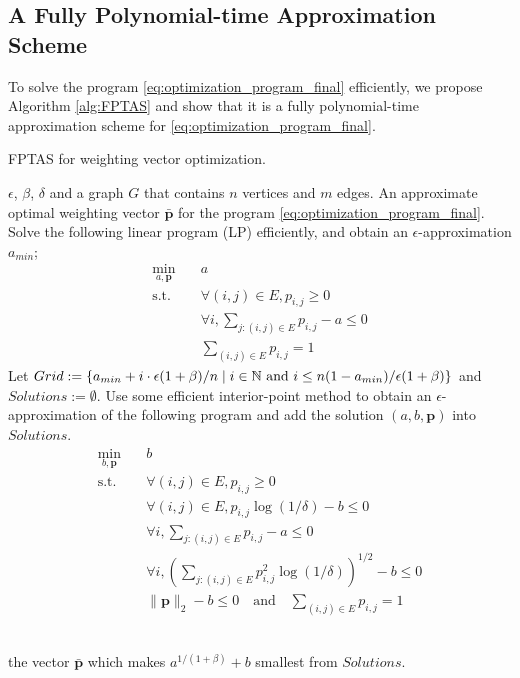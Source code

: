 \documentclass[letterpaper]{article} %
\newcommand{\probdistri}{\mathbf{p}}
\newcommand{\pair}[1]{(#1)}
\newcommand{\red}[1]{\textcolor{red}{#1}}
\newcommand{\todo}[1]{\red{\textsc{todo:} #1}}
\begin{document}
\subsection{A Fully Polynomial-time Approximation Scheme} %
\label{sub:ptas}

To solve the program \eqref{eq:optimization_program_final} efficiently, we propose Algorithm \ref{alg:FPTAS} and show that it is a fully polynomial-time approximation scheme for \eqref{eq:optimization_program_final}. 

\begin{algorithm}[!htb] 
\caption{FPTAS for weighting vector optimization.} 
\label{alg:FPTAS} 
\begin{algorithmic}[1]
\Require 
$\epsilon$, $\beta$, $\delta$ and a graph $G$ that contains $n$ vertices and $m$ edges. 
\Ensure 
An approximate optimal weighting vector $\bar{\probdistri{}}$ for the program \eqref{eq:optimization_program_final}. 
\State Solve the following linear program (LP) efficiently\footnotemark,
and obtain an $\epsilon$-approximation 
$a_{min}$;
  \begin{equation}
    \label{eq:optimization_program_final_fix_b}
\begin{aligned}
    \min_{a,\probdistri{}} \quad&
    a\\
    \mbox{s.t.} \quad &\forall \pair{i,j}\in E, p_{i,j}\ge 0 \\
    & \forall i, \sum_{j:\pair{i,j}\in E} p_{i,j} -a  \le 0\\
    & \sum_{\pair{i,j}\in E} p_{i,j}= 1
\end{aligned}
\end{equation}
\State Let $Grid:=\{a_{min}+i\cdot\epsilon(1+\beta)/n \mid  i\in \mathbb{N} \hbox{ and } i\le n(1-a_{min})/\epsilon(1+\beta)\}$ and $Solutions := \emptyset$. 
  \State Use some efficient interior-point method to obtain an $\epsilon$-approximation of the following program and add the solution $(a,b,\probdistri{})$ into $Solutions$.
  \begin{equation}
    \label{eq:optimization_program_final_fix_a}
\begin{aligned}
    \min_{b,\probdistri{}} \quad&
    b\\
    \mbox{s.t.} \quad &\forall \pair{i,j}\in E, p_{i,j}\ge 0 \\
    & \forall \pair{i,j}\in E, p_{i,j}\log(1/\delta) - b \le 0\\
    & \forall i, \sum_{j:\pair{i,j}\in E} p_{i,j} -a  \le 0\\
    & \forall i, \left(\sum_{j:\pair{i,j}\in E} p^2_{i,j}\log(1/\delta)\right)^{1/2} -b  \le 0\\
    & \|\probdistri{}\|_2 -b \le 0 \quad \mbox{and} \quad \sum_{\pair{i,j}\in E} p_{i,j}= 1
\end{aligned}
\end{equation}

\EndFor\\
\Return the vector $\bar{\probdistri{}}$ which makes $a^{1/(1+\beta)}+b$ smallest from $Solutions$. 
\end{algorithmic}
\end{algorithm}
\end{document}
